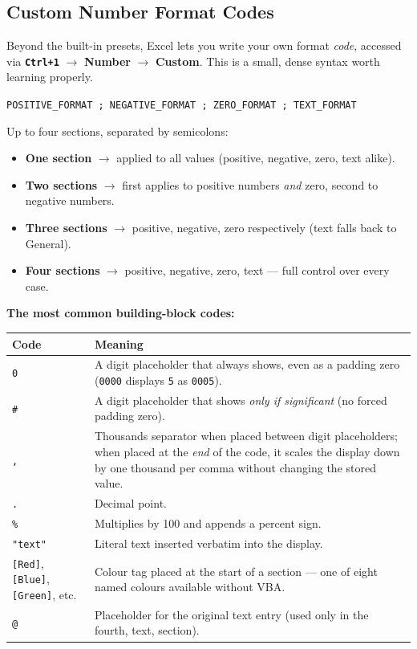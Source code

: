 \documentclass[11pt,a4paper]{article}
\newcommand{\key}[1]{\texttt{\colorbox{black!8}{\textbf{#1}}}}
\begin{document}
\subsection{Custom Number Format Codes}
\label{sec:customformat}

Beyond the built-in presets, Excel lets you write your own format \emph{code}, accessed via \key{Ctrl+1} $\rightarrow$ \textbf{Number} $\rightarrow$ \textbf{Custom}. This is a small, dense syntax worth learning properly.

\begin{formulasyntax}
\begin{center}
\texttt{POSITIVE\_FORMAT ; NEGATIVE\_FORMAT ; ZERO\_FORMAT ; TEXT\_FORMAT}
\end{center}
Up to four sections, separated by semicolons:
\begin{itemize}
  \item \textbf{One section} $\rightarrow$ applied to all values (positive, negative, zero, text alike).
  \item \textbf{Two sections} $\rightarrow$ first applies to positive numbers \emph{and} zero, second to negative numbers.
  \item \textbf{Three sections} $\rightarrow$ positive, negative, zero respectively (text falls back to General).
  \item \textbf{Four sections} $\rightarrow$ positive, negative, zero, text --- full control over every case.
\end{itemize}
\end{formulasyntax}

\textbf{The most common building-block codes:}

\begin{center}
\begin{tabular}{@{}p{2.2cm}p{9.8cm}@{}}
\toprule
\textbf{Code} & \textbf{Meaning} \\
\midrule
\texttt{0} & A digit placeholder that always shows, even as a padding zero (\texttt{0000} displays \texttt{5} as \texttt{0005}). \\
\texttt{\#} & A digit placeholder that shows \emph{only if significant} (no forced padding zero). \\
\texttt{,} & Thousands separator when placed between digit placeholders; when placed at the \emph{end} of the code, it scales the display down by one thousand per comma without changing the stored value. \\
\texttt{.} & Decimal point. \\
\texttt{\%} & Multiplies by 100 and appends a percent sign. \\
\texttt{"text"} & Literal text inserted verbatim into the display. \\
\texttt{[Red]}, \texttt{[Blue]}, \texttt{[Green]}, etc. & Colour tag placed at the start of a section --- one of eight named colours available without VBA. \\
\texttt{@} & Placeholder for the original text entry (used only in the fourth, text, section). \\
\bottomrule
\end{tabular}
\end{center}
\end{document}
